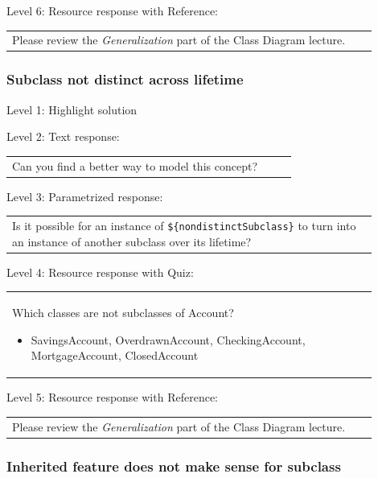 \noindent Level 6: Resource response with Reference: \medskip

\begin{tabular}{|p{0.9\linewidth}}
Please review the \textit{Generalization} part of the Class Diagram lecture.
\end{tabular} \medskip


\subsubsection{Subclass not distinct across lifetime}

\noindent Level 1: Highlight solution  \medskip

\noindent Level 2: Text response: \medskip

\begin{tabular}{|p{0.9\linewidth}}
Can you find a better way to model this concept?
\end{tabular} \medskip

\noindent Level 3: Parametrized response: \medskip

\begin{tabular}{|p{0.9\linewidth}}
Is it possible for an instance of \verb|${nondistinctSubclass}| to turn into an instance of another subclass over its lifetime?
\end{tabular} \medskip

\noindent Level 4: Resource response with Quiz: \medskip

\begin{tabular}{|p{0.9\linewidth}}
Which classes are not subclasses of Account?
\begin{itemize}
    \item SavingsAccount, OverdrawnAccount, CheckingAccount, MortgageAccount, ClosedAccount
\end{itemize}

\end{tabular} \medskip

\noindent Level 5: Resource response with Reference: \medskip

\begin{tabular}{|p{0.9\linewidth}}
Please review the \textit{Generalization} part of the Class Diagram lecture.
\end{tabular} \medskip


\subsubsection{Inherited feature does not make sense for subclass}

